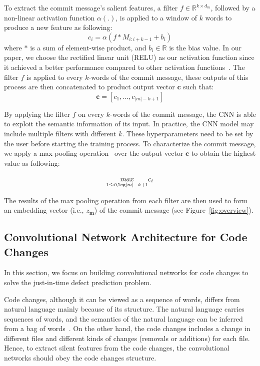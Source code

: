 To extract the commit message's salient features, a filter $f \in \mathbb{R}^{k \times {d_m}}$, followed by a non-linear activation function $\alpha (.)$, is applied to a window of $k$ words to produce a new feature as following:
\begin{equation}
\label{eq:filter_msg}
    c_i = \alpha(f * M_{i:i+k-1} + b_i)
\end{equation}
where $*$ is a sum of element-wise product, and $b_i \in \mathbb{R}$ is the bias value. In our paper, we choose the rectified linear unit (RELU) as our activation function since it achieved a better performance compared to other activation functions~\cite{nair2010rectified, dahl2013improving, he2016deep}. The filter $f$ is applied to every $k$-words of the commit message, these outputs of this process are then concatenated to product output vector $\textbf{c}$ such that:
\begin{equation}
\label{eq:output_ftr_msg}
\textbf{c} = [c_1, \dots, c_{|m| - k + 1}]
\end{equation}

By applying the filter $f$ on every $k$-words of the commit message, the CNN is able to exploit the semantic information of its input. In practice, the CNN model may include multiple filters with different $k$. These hyperparameters need to be set by the user before starting the training process. To characterize the commit message, we apply a max pooling operation~\cite{lecun2015deep} over the output vector $\textbf{c}$ to obtain the highest value as following: 

\begin{equation}
\label{eq:max_pooling_msg}
\underset{1 \leq i \leg |m| - k + 1}{max} c_i
\end{equation}

The results of the max pooling operation from each filter are then used to form an embedding vector (i.e., $z_\textbf{m}$) of the commit message (see Figure~\ref{fig:overview}). 

\subsection{Convolutional Network Architecture for Code Changes}
\label{sec:cnn_code}
In this section, we focus on building convolutional networks for code changes to solve the just-in-time defect prediction problem. 

Code changes, although it can be viewed as a sequence of words, differs from natural language mainly because of its structure. The natural language carries sequences of words, and the semantics of the natural language can be inferred from a bag of words~\cite{ng1997corpus}. On the other hand, the code changes includes a change in different files and different kinds of changes (removals or additions) for each file. Hence, to extract silent features from the code changes, the convolutional networks should obey the code changes structure. 


